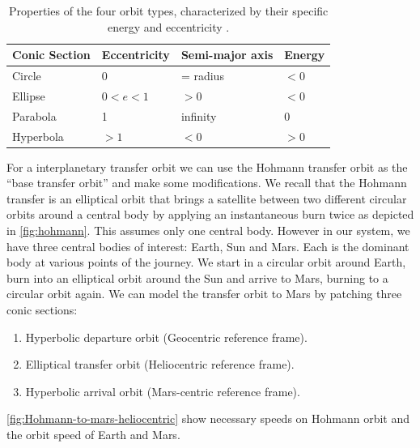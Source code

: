 \begin{table}[tbp]
    \centering
    \begin{tabular}{@{}llll@{}}
    \toprule
    Conic Section & Eccentricity    & Semi-major axis & Energy  \\ \midrule
    Circle        & $0$             & = radius        & $<0$    \\
    Ellipse       & $0 < e < 1$     & $>0$            & $<0$    \\
    Parabola      & 1               & infinity        & $0$     \\
    Hyperbola     & $>1$            & $<0$            & $>0$    \\ \bottomrule
    \end{tabular}
    \caption{Properties of the four orbit types, characterized by their specific energy and eccentricity \cite{Braeunig}.}
    \label{tab:orbit-type-properties}
\end{table}


For a interplanetary transfer orbit we can use the Hohmann transfer orbit as the ``base transfer orbit'' and make some modifications. We recall that the Hohmann transfer is an elliptical orbit that brings a satellite between two different circular orbits around a central body by applying an instantaneous burn twice as depicted in \cref{fig:hohmann}. This assumes only one central body. However in our system, we have three central bodies of interest: Earth, Sun and Mars. Each is the dominant body at various points of the journey. We start in a circular orbit around Earth, burn into an elliptical orbit around the Sun and arrive to Mars, burning to a circular orbit again. We can model the transfer orbit to Mars by patching three conic sections:

\begin{enumerate}
	\item Hyperbolic departure orbit (Geocentric reference frame).
	\item Elliptical transfer orbit (Heliocentric reference frame).
	\item Hyperbolic arrival orbit (Mars-centric reference frame).
\end{enumerate}

\cref{fig:Hohmann-to-mars-heliocentric} show necessary speeds on Hohmann orbit and the orbit speed of Earth and Mars. 

